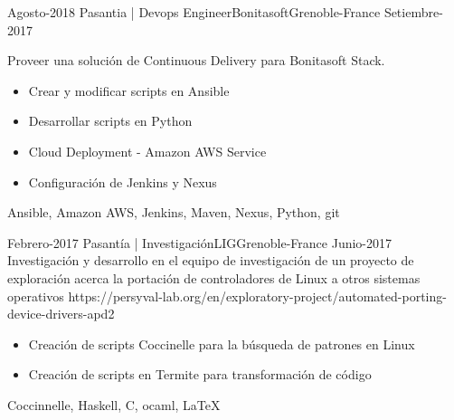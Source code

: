 \begin{experiences}
  \experience
    {Agosto-2018}   {Pasantia | Devops Engineer}{Bonitasoft}{Grenoble-France}
    {Setiembre-2017}
                    {Proveer una solución de Continuous Delivery para Bonitasoft Stack.
                    \begin{itemize}
                        \item Crear y modificar scripts en Ansible
                        \item Desarrollar scripts en Python
                        \item Cloud Deployment - Amazon AWS Service
                        \item Configuración de Jenkins y Nexus
                      \end{itemize}}
                    {Ansible, Amazon AWS, Jenkins, Maven, Nexus, Python, git}
  \emptySeparator

    \projectexperiences
    {Febrero-2017}   {Pasantía | Investigación}{LIG}{Grenoble-France}
    {Junio-2017}
                    {
                    Investigación y desarrollo en el equipo de investigación de un proyecto
                    de exploración acerca la portación de controladores de Linux a otros sistemas
                    operativos \tiny{https://persyval-lab.org/en/exploratory-project/automated-porting-device-drivers-apd2}
                    }
                    {
                    \begin{itemize}
                        \item Creación de scripts Coccinelle para la búsqueda de patrones en Linux
                        \item Creación de scripts en Termite para transformación de código
                      \end{itemize}
                     }
                    {Coccinnelle, Haskell, C, ocaml, \LaTeX}
  \emptySeparator


\end{experiences}

